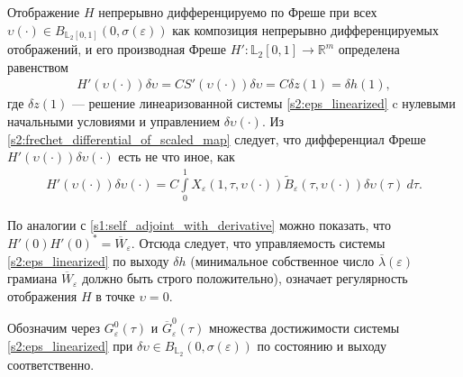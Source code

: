 \documentclass[../main.tex]{subfiles}
\begin{document}
Отображение $ H $ непрерывно дифференцируемо по Фреше при всех $ \upsilon(\cdot) \in B_{\mathbb{L}_2[0,1]}(0,\sigma(\varepsilon)) $ как композиция непрерывно дифференцируемых отображений, и его производная Фреше $ H': \mathbb{L}_2[0,1] \rightarrow \mathbb{R}^m $ определена равенством
\begin{gather*}
	H'( \upsilon(\cdot))\delta \upsilon = C S'(\upsilon(\cdot))\delta \upsilon = C \delta z(1) = \delta h(1),
\end{gather*}
где $ \delta z(1) $ --- решение линеаризованной системы \eqref{s2:eps_linearized} c нулевыми начальными условиями и управлением $ \delta \upsilon(\cdot) $. 
 Из \eqref{s2:freсhet_differential_of_scaled_map} следует, что дифференциал Фреше $ H'(\upsilon(\cdot)) \delta \upsilon(\cdot) $ есть не что иное, как
\begin{gather*}
	H'(\upsilon(\cdot)) \delta \upsilon(\cdot) = C \int\limits_0^1 X_{\varepsilon}(1,\tau, \upsilon(\cdot)) \widetilde{B}_{\varepsilon} (\tau, \upsilon(\cdot)) \delta \upsilon(\tau) \ d \tau.
\end{gather*}

По аналогии с \eqref{s1:self_adjoint_with_derivative} можно показать, что $ H'(0) H'(0)^* = \overline{W}_{\varepsilon}$. 
Отсюда следует, что управляемость системы \eqref{s2:eps_linearized} по выходу $\delta h$ (минимальное собственное число $\overline{\lambda}(\varepsilon)$ грамиана $ \overline{W}_{\varepsilon}$ должно быть строго положительно), означает регулярность отображения $H$ в точке $\upsilon = 0$.

Обозначим через $G^0_{\varepsilon}(\tau)$ и $\overline{G}^0_{\varepsilon}(\tau)$ множества достижимости системы \eqref{s2:eps_linearized} при $\delta \upsilon \in B_{\mathbb{L}_2}(0, \sigma(\varepsilon))$ по состоянию и выходу соответственно.
\end{document}
